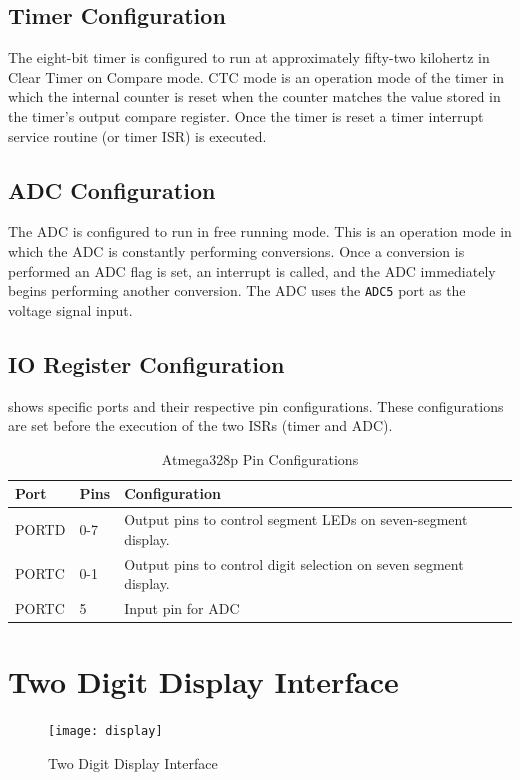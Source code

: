 \documentclass[main.tex]{subfiles}
\begin{document}
		\subsection{Timer Configuration}
		The eight-bit timer is configured to run at approximately fifty-two
		kilohertz in Clear Timer on Compare mode. CTC mode is an operation mode of
		the timer in which the internal counter is reset when the counter matches
		the value stored in the timer's output compare register. Once the timer is
		reset a timer interrupt service routine (or timer ISR) is executed.

		\subsection{ADC Configuration}
		The ADC is configured to run in free running mode. This is an operation mode
		in which the ADC is constantly performing conversions. Once a conversion is
		performed an ADC flag is set, an interrupt is called, and the ADC
		immediately begins performing another conversion. The ADC uses the
		\lstinline{ADC5} port as the voltage signal input. 

		\subsection{IO Register Configuration}
		 shows specific ports and their respective pin
		configurations. These configurations are set before the execution of the two
		ISRs (timer and ADC).

		\begin{table}[H]
			\begin{center}
				\begin{tabularx}{\textwidth}{llX} 
					\toprule 
					Port & Pins & Configuration \\ \midrule 
					PORTD & 0-7 & Output pins to control segment LEDs on seven-segment display. \\  \midrule
					PORTC & 0-1 & Output pins to control digit selection on seven segment display. \\ \midrule
					PORTC & 5 & Input pin for ADC \\
					\bottomrule
				\end{tabularx}
				\caption{Atmega328p Pin Configurations}
				\label{tab:pinConfig}
			\end{center}
		\end{table}
	
	\section{Two Digit Display Interface}
		\begin{figure}[H]
			\begin{center}
				\texttt{[image: display]}
			\end{center}
			\caption{Two Digit Display Interface}
			\label{fig:twoDigitIfc}
		\end{figure}
\end{document}
